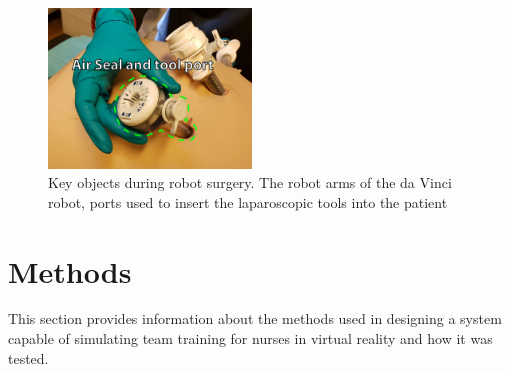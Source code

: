 \documentclass[conference]{IEEEtran}
\begin{document}



\begin{figure}[H]
\includegraphics[width=0.48\textwidth]{Figures/fieldstudyresults.pdf}
\caption{Key objects during robot surgery. The robot arms of the da Vinci robot, ports used to insert the laparoscopic tools into the patient}
\label{Fig:fieldresult}
\end{figure}

\section{Methods}
This section provides information about the methods used in designing a system capable of simulating team training for nurses in virtual reality and how it was tested. 
\end{document}
